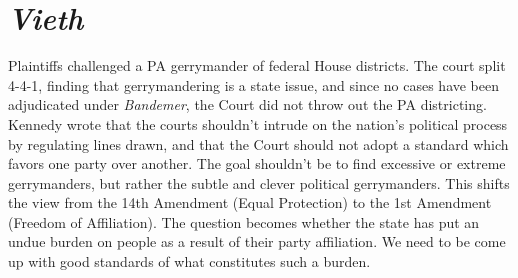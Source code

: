 \section*{\textit{Vieth}}
Plaintiffs challenged a PA gerrymander of federal House districts.  The court split 4-4-1, finding that gerrymandering is a state issue, and since no cases have been adjudicated under \textit{Bandemer}, the Court did not throw out the PA districting.  Kennedy wrote that the courts shouldn't intrude on the nation's political process by regulating lines drawn, and that the Court should not adopt a standard which favors one party over another.  The goal shouldn't be to find excessive or extreme gerrymanders, but rather the subtle and clever political gerrymanders.  This shifts the view from the 14th Amendment (Equal Protection) to the 1st Amendment (Freedom of Affiliation).  The question becomes whether the state has put an undue burden on people as a result of their party affiliation.  We need to be come up with good standards of what constitutes such a burden.